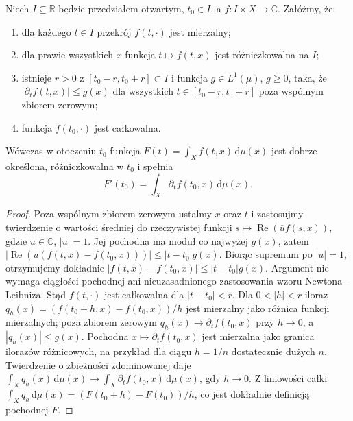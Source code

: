 \begin{twierdzenie}
\label{thm:local-differentiation-11}
Niech $I\subseteq\mathbb R$ będzie przedziałem otwartym,
$t_0\in I$, a $f:I\times X\to\mathbb C$. Załóżmy, że:
\begin{enumerate}[label=\textup{(\roman*)}]
\item dla każdego $t\in I$ przekrój $f(t,\cdot)$ jest mierzalny;
\item dla prawie wszystkich $x$ funkcja $t\mapsto f(t,x)$ jest
      różniczkowalna na $I$;
\item istnieje $r>0$ z $[t_0-r,t_0+r]\subset I$ i funkcja
      $g\in L^1(\mu)$, $g\ge0$, taka, że
      $|\partial_t f(t,x)|\le g(x)$ dla wszystkich
      $t\in[t_0-r,t_0+r]$ poza wspólnym zbiorem zerowym;
\item funkcja $f(t_0,\cdot)$ jest całkowalna.
\end{enumerate}
Wówczas w otoczeniu $t_0$ funkcja
$F(t)=\int_Xf(t,x)\,\mathrm d\mu(x)$ jest dobrze określona,
różniczkowalna w $t_0$ i spełnia
\begin{equation}\label{eq:diff-param-11}
F'(t_0)=\int_X\partial_t f(t_0,x)\,\mathrm d\mu(x).
\end{equation}
\end{twierdzenie}
\begin{proof}
Poza wspólnym zbiorem zerowym ustalmy $x$ oraz $t$
i zastosujmy twierdzenie o wartości średniej do
rzeczywistej funkcji
$s\mapsto\operatorname{Re}(\overline{u}f(s,x))$,
gdzie $u\in\mathbb C$, $|u|=1$. Jej pochodna
ma moduł co najwyżej $g(x)$, zatem
$|\operatorname{Re}(\overline{u}(f(t,x)-f(t_0,x)))|
\le |t-t_0|g(x)$. Biorąc supremum po
$|u|=1$, otrzymujemy dokładnie
$|f(t,x)-f(t_0,x)|\le |t-t_0|g(x)$.
Argument nie wymaga ciągłości pochodnej ani
nieuzasadnionego zastosowania wzoru Newtona--Leibniza.
Stąd $f(t,\cdot)$ jest całkowalna dla $|t-t_0|<r$.
Dla $0<|h|<r$ iloraz
$q_h(x)=(f(t_0+h,x)-f(t_0,x))/h$ jest mierzalny
jako różnica funkcji mierzalnych; poza zbiorem zerowym
$q_h(x)\to\partial_tf(t_0,x)$ przy $h\to0$,
a $|q_h(x)|\le g(x)$. Pochodna $x\mapsto\partial_tf(t_0,x)$
jest mierzalna jako granica ilorazów różnicowych, na przykład
dla ciągu $h=1/n$ dostatecznie dużych $n$.
Twierdzenie o zbieżności zdominowanej daje
$\int_Xq_h(x)\,\mathrm d\mu(x)\to
\int_X\partial_tf(t_0,x)\,\mathrm d\mu(x)$,
gdy $h\to0$. Z liniowości całki
$\int_Xq_h\,\mathrm d\mu(x)=(F(t_0+h)-F(t_0))/h$,
co jest dokładnie definicją pochodnej $F$.
\end{proof}

